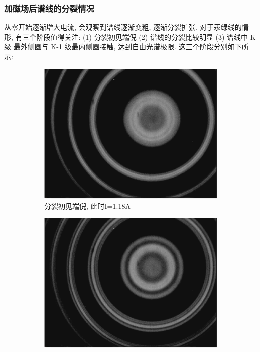 \documentclass[12pt,a4paper]{article}
\begin{document}
\subsubsection{加磁场后谱线的分裂情况}
从零开始逐渐增大电流, 会观察到谱线逐渐变粗, 逐渐分裂扩张. 对于汞绿线的情
形, 有三个阶段值得关注: (1) 分裂初见端倪 (2) 谱线的分裂比较明显 (3) 谱线中 K 级
最外侧圆与 K-1 级最内侧圆接触, 达到自由光谱极限. 这三个阶段分别如下所示:
\begin{figure}[H]
    \centering
    \begin{subfigure}[b]{0.3\textwidth}
      \centering
      \includegraphics[width=\textwidth]{1.18yy.png}
      \caption{分裂初见端倪, 此时I=1.18A}
    \end{subfigure}
    \hfill
    \begin{subfigure}[b]{0.3\textwidth}
      \centering
      \includegraphics[width=\textwidth]{2.01yy.png}

\end{subfigure}
\end{figure}
\end{document}
